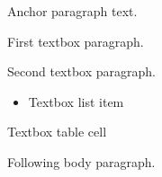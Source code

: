 \documentclass[11pt,a4paper]{article}
\begin{document}
Anchor paragraph text.

First textbox paragraph.

Second textbox paragraph.

\begin{itemize}
\item Textbox list item
\end{itemize}

Textbox table cell

Following body paragraph.
\end{document}
